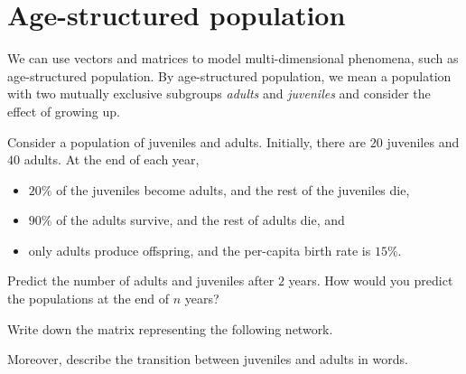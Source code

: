 \documentclass[../main.tex]{subfiles}
\begin{document}
 \section{Age-structured population}

We can use vectors and matrices to model multi-dimensional phenomena, such as age-structured population.   By age-structured population, we mean a population with two mutually exclusive subgroups \emph{adults} and \emph{juveniles} and consider the effect of growing up.

\begin{example} \label{eg:age-structure-model}
  Consider a population of juveniles and adults. Initially, there are \(20\) juveniles and \(40\) adults. At the end of each year, 
  \begin{itemize}[itemsep={0ex}]
    \item \(20\%\) of the juveniles become adults, and the rest of the juveniles die, 
    \item \(90\%\) of the adults survive, and the rest of adults die, and
    \item only adults produce offspring,  and the per-capita birth rate is \(15\%\).
  \end{itemize}

  Predict the number of adults and juveniles after \(2\) years.  How would you predict the populations at the end of \(n\) years?

  \blanks*

  \clearpage

  \blanks*
\end{example}
\clearpage

\begin{exercise} \label{ex:transition-network-to-matrix}
  Write down the matrix representing the following network.

  \begin{center}
    
  \end{center}

  Moreover, describe the transition between juveniles and adults in words.

\end{exercise}
\end{document}
